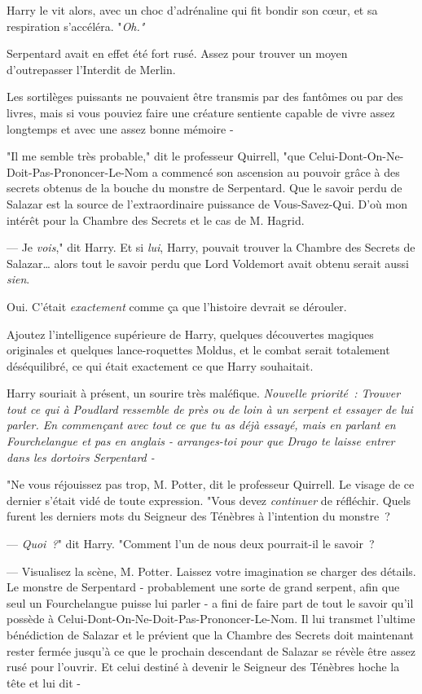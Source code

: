 Harry le vit alors, avec un choc d'adrénaline qui fit bondir son cœur, et sa respiration s'accéléra. "\emph{Oh."}

Serpentard avait en effet été fort rusé. Assez pour trouver un moyen d'outrepasser l'Interdit de Merlin.

Les sortilèges puissants ne pouvaient être transmis par des fantômes ou par des livres, mais si vous pouviez faire une créature sentiente capable de vivre assez longtemps et avec une assez bonne mémoire -

"Il me semble très probable," dit le professeur Quirrell, "que Celui-Dont-On-Ne-Doit-Pas-Prononcer-Le-Nom a commencé son ascension au pouvoir grâce à des secrets obtenus de la bouche du monstre de Serpentard. Que le savoir perdu de Salazar est la source de l'extraordinaire puissance de Vous-Savez-Qui. D'où mon intérêt pour la Chambre des Secrets et le cas de M. Hagrid.

--- Je \emph{vois}," dit Harry. Et si \emph{lui}, Harry, pouvait trouver la Chambre des Secrets de Salazar… alors tout le savoir perdu que Lord Voldemort avait obtenu serait aussi \emph{sien}.

Oui. C'était \emph{exactement} comme ça que l'histoire devrait se dérouler.

Ajoutez l'intelligence supérieure de Harry, quelques découvertes magiques originales et quelques lance-roquettes Moldus, et le combat serait totalement déséquilibré, ce qui était exactement ce que Harry souhaitait.

Harry souriait à présent, un sourire très maléfique. \emph{Nouvelle priorité~: Trouver tout ce qui à Poudlard ressemble de près ou de loin à un serpent et essayer de lui parler. En commençant avec tout ce que tu as déjà essayé, mais en parlant en Fourchelangue et pas en anglais - arranges-toi pour que Drago te laisse entrer dans les dortoirs Serpentard -}

"Ne vous réjouissez pas trop, M. Potter, dit le professeur Quirrell. Le visage de ce dernier s'était vidé de toute expression. "Vous devez \emph{continuer} de réfléchir. Quels furent les derniers mots du Seigneur des Ténèbres à l'intention du monstre~?

--- \emph{Quoi~?}" dit Harry. "Comment l'un de nous deux pourrait-il le savoir~?

--- Visualisez la scène, M. Potter. Laissez votre imagination se charger des détails. Le monstre de Serpentard - probablement une sorte de grand serpent, afin que seul un Fourchelangue puisse lui parler - a fini de faire part de tout le savoir qu'il possède à Celui-Dont-On-Ne-Doit-Pas-Prononcer-Le-Nom. Il lui transmet l'ultime bénédiction de Salazar et le prévient que la Chambre des Secrets doit maintenant rester fermée jusqu'à ce que le prochain descendant de Salazar se révèle être assez rusé pour l'ouvrir. Et celui destiné à devenir le Seigneur des Ténèbres hoche la tête et lui dit -

